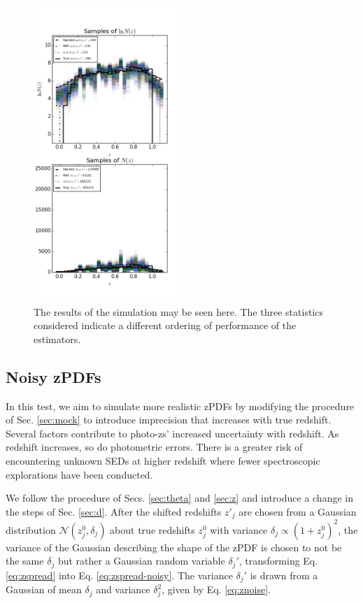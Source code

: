 \documentclass[preprint]{aastex}
\begin{document}
\begin{figure}
\includegraphics[width=0.5\textwidth]{samps-real.png}
\caption{The results of the simulation may be seen here.  The three statistics considered indicate a different ordering of performance of the estimators.}
\label{fig:nullparam}
\end{figure}

\clearpage
\subsection{Noisy zPDFs}
\label{sec:noisy}

In this test, we aim to simulate more realistic zPDFs by modifying the procedure of Sec. \ref{sec:mock} to introduce imprecision that increases with true redshift.  Several factors contribute to photo-zs' increased uncertainty with redshift.  As redshift increases, so do photometric errors.  There is a greater risk of encountering unknown SEDs at higher redshift where fewer spectroscopic explorations have been conducted.  

We follow the procedure of Secs. \ref{sec:theta} and \ref{sec:z} and introduce a change in the steps of Sec. \ref{sec:d}.  After the shifted redshifts $z'_{j}$ are chosen from a Gaussian distribution $\mathcal{N}(z_{j}^{0},\delta_{j})$ about true redshifts $z_{j}^{0}$ with variance $\delta_{j}\propto(1+z_{j}^{0})^{2}$, the variance of the Gaussian describing the shape of the zPDF is chosen to not be the same $\delta_{j}$ but rather a Gaussian random variable $\delta_{j}'$, transforming Eq. \ref{eq:zspread} into Eq. \ref{eq:zspread-noisy}.  The variance $\delta_{j}'$ is drawn from a Gaussian of mean $\delta_{j}$ and variance $\delta_{j}^{2}$, given by Eq. \ref{eq:znoise}.
\end{document}
